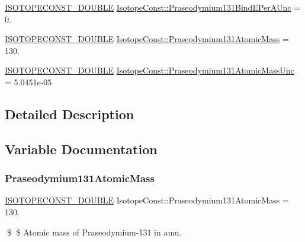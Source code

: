 \begin{DoxyCompactItemize}
\item 
\mbox{\hyperlink{group___isotope_const-_macros_ga8f45a7272ce02c0b4c65c44636ed719a}{I\+S\+O\+T\+O\+P\+E\+C\+O\+N\+S\+T\+\_\+\+D\+O\+U\+B\+LE}} \mbox{\hyperlink{group___isotope_const-_praseodymium-_pr131_ga987d7ffcd7349aa43016da3d6789fe20}{Isotope\+Const\+::\+Praseodymium131\+Bind\+E\+Per\+A\+Unc}} = 0.
\item 
\mbox{\hyperlink{group___isotope_const-_macros_ga8f45a7272ce02c0b4c65c44636ed719a}{I\+S\+O\+T\+O\+P\+E\+C\+O\+N\+S\+T\+\_\+\+D\+O\+U\+B\+LE}} \mbox{\hyperlink{group___isotope_const-_praseodymium-_pr131_gadd88eb85a28cd62e10f3be9d3f5f5fd6}{Isotope\+Const\+::\+Praseodymium131\+Atomic\+Mass}} = 130.
\item 
\mbox{\hyperlink{group___isotope_const-_macros_ga8f45a7272ce02c0b4c65c44636ed719a}{I\+S\+O\+T\+O\+P\+E\+C\+O\+N\+S\+T\+\_\+\+D\+O\+U\+B\+LE}} \mbox{\hyperlink{group___isotope_const-_praseodymium-_pr131_gaa18eb0198bfb8a233fc5b09c9de5de52}{Isotope\+Const\+::\+Praseodymium131\+Atomic\+Mass\+Unc}} = 5.\+0451e-\/05
\end{DoxyCompactItemize}


\subsection{Detailed Description}


\subsection{Variable Documentation}
\mbox{\label{group___isotope_const-_praseodymium-_pr131_gadd88eb85a28cd62e10f3be9d3f5f5fd6}} 
\subsubsection{\texorpdfstring{Praseodymium131\+Atomic\+Mass}{Praseodymium131AtomicMass}}
{\footnotesize\ttfamily \mbox{\hyperlink{group___isotope_const-_macros_ga8f45a7272ce02c0b4c65c44636ed719a}{I\+S\+O\+T\+O\+P\+E\+C\+O\+N\+S\+T\+\_\+\+D\+O\+U\+B\+LE}} Isotope\+Const\+::\+Praseodymium131\+Atomic\+Mass = 130.}

\$ \$ Atomic mass of Praseodymium-\/131 in amu. \mbox{\label{group___isotope_const-_praseodymium-_pr131_gaa18eb0198bfb8a233fc5b09c9de5de52}} 
